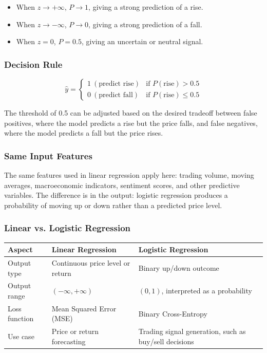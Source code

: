 \documentclass[12pt,openany]{book}
\begin{document}
\begin{itemize}[leftmargin=*]
    \item When \(z \rightarrow +\infty\), \(P \rightarrow 1\), giving a strong prediction of a rise.
    \item When \(z \rightarrow -\infty\), \(P \rightarrow 0\), giving a strong prediction of a fall.
    \item When \(z = 0\), \(P = 0.5\), giving an uncertain or neutral signal.
\end{itemize}

\subsubsection{Decision Rule}

\begin{equation*}
    \hat{y} =
    \begin{cases}
        1\ (\text{predict rise}) & \text{if } P(\text{rise}) > 0.5 \\
        0\ (\text{predict fall}) & \text{if } P(\text{rise}) \leq 0.5
    \end{cases}
\end{equation*}

The threshold of 0.5 can be adjusted based on the desired tradeoff between false positives, where the model predicts a rise but the price falls, and false negatives, where the model predicts a fall but the price rises.

\subsubsection{Same Input Features}

The same features used in linear regression apply here: trading volume, moving averages, macroeconomic indicators, sentiment scores, and other predictive variables. The difference is in the output: logistic regression produces a probability of moving up or down rather than a predicted price level.

\subsubsection{Linear vs. Logistic Regression}

\begin{center}
\scriptsize
\setlength{\tabcolsep}{3pt}
\begin{tabular}{|L{3.2cm}|L{4.5cm}|L{4.5cm}|}
\hline
\textbf{Aspect} & \textbf{Linear Regression} & \textbf{Logistic Regression} \\
\hline
Output type & Continuous price level or return & Binary up/down outcome \\
\hline
Output range & \(( -\infty, +\infty )\) & \((0, 1)\), interpreted as a probability \\
\hline
Loss function & Mean Squared Error (MSE) & Binary Cross-Entropy \\
\hline
Use case & Price or return forecasting & Trading signal generation, such as buy/sell decisions \\
\hline
\end{tabular}
\end{center}
\end{document}
